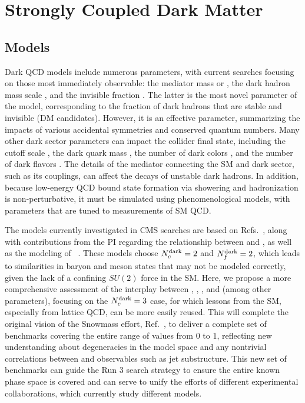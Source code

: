 \section{Strongly Coupled Dark Matter}\label{sec:darkqcd}

\subsection{Models}\label{subsec:models}

Dark QCD models include numerous parameters, with current searches focusing on those most immediately observable:
the mediator mass \mZprime or \mbifun, the dark hadron mass scale \mdark, and the invisible fraction \rinv.
The latter is the most novel parameter of the model, corresponding to the fraction of dark hadrons that are stable and invisible (DM candidates).
However, it is an effective parameter, summarizing the impacts of various accidental symmetries and conserved quantum numbers.
Many other dark sector parameters can impact the collider final state, including the cutoff scale \Lamdark, the dark quark mass \mqdark, the number of dark colors \Ncdark, and the number of dark flavors \Nfdark.
The details of the mediator connecting the SM and dark sector, such as its couplings, can affect the decays of unstable dark hadrons.
In addition, because low-energy QCD bound state formation via showering and hadronization is non-perturbative, it must be simulated using phenomenological models,
with parameters that are tuned to measurements of SM QCD.

The models currently investigated in CMS searches are based on Refs.~\cite{Cohen:2015toa,Cohen:2017pzm}, along with contributions from the PI
regarding the relationship between \mdark and \Lamdark, as well as the modeling of \rinv~\cite{Albouy:2022cin}.
These models choose $N_{c}^{\text{dark}}=2$ and $N_{f}^{\text{dark}}=2$, which leads to similarities in baryon and meson states that may not be modeled correctly,
given the lack of a confining $SU(2)$ force in the SM.
Here, we propose a more comprehensive assessment of the interplay between \Nfdark, \Lamdark, \mdark, and \mqdark (among other parameters),
focusing on the $N_{c}^{\text{dark}}=3$ case, for which lessons from the SM, especially from lattice QCD, can be more easily reused.
This will complete the original vision of the Snowmass effort, Ref.~\cite{Albouy:2022cin},
to deliver a complete set of benchmarks covering the entire range of \rinv values from 0 to 1,
reflecting new understanding about degeneracies in the model space and any nontrivial correlations between \rinv and observables such as jet substructure.
This new set of benchmarks can guide the Run 3 search strategy to ensure the entire known phase space is covered
and can serve to unify the efforts of different experimental collaborations, which currently study different models.

